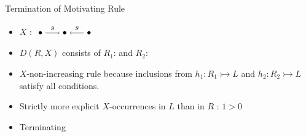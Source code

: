 \documentclass{beamer}
\begin{document}
\begin{frame}{Termination of Motivating Rule}
\begin{center}
{\begin{tikzpicture}
            \end{tikzpicture}
            }
    \end{center}

   



    \begin{itemize}
        \item  $X$ : $\tikz[baseline=-0.5ex]{ 
                \node (x) at (0,0) {$\bullet$}; 
                \node (y) at (1,0) {$\bullet$};
                \node (z) at (2,0) {$\bullet$};
                \draw[->] (x) -- (y) node[midway, above] {$s$};
                \draw[->] (z) -- (y) node[midway, above] {$s$};
        }$
        \item $D(R,X)$ consists of $R_1$:
         and $R_2$:
        \item $X$-non-increasing rule because inclusions from $h_1: R_1 \rightarrowtail L$ and $h_2: R_2 \rightarrowtail L$ satisfy all conditions.
        \item Strictly more explicit $X$-occurrences in $L$ than in $R$ : $1 \mathop{>} 0$
        \item Terminating
    \end{itemize}


\end{frame}
\end{document}
